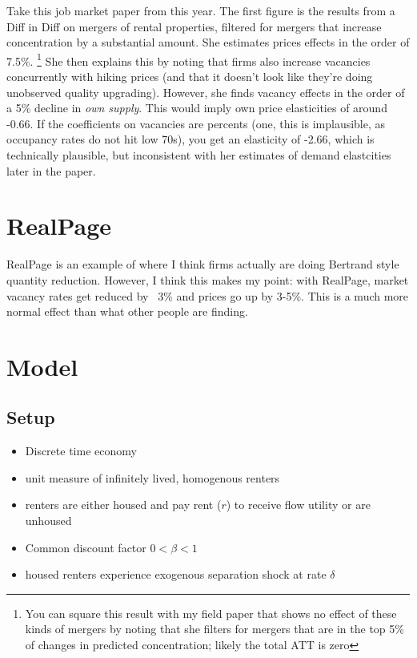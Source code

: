 \documentclass{article}
\begin{document}
Take this job market paper from this year. The first figure is the results from a Diff in Diff on mergers of rental properties, filtered for mergers that increase concentration by a substantial amount. She estimates prices effects in the order of 7.5\%. \footnote{You can square this result with my field paper that shows no effect of these kinds of mergers by noting that she filters for mergers that are in the top 5\% of changes in predicted concentration; likely the total ATT is zero} She then explains this by noting that firms also increase vacancies concurrently with hiking prices (and that it doesn't look like they're doing unobserved quality upgrading). However, she finds vacancy effects in the order of a 5\% decline in \textit{own supply}. This would imply own price elasticities of around -0.66. If the coefficients on vacancies are percents (one, this is implausible, as occupancy rates do not hit low 70s), you get an elasticity of -2.66, which is technically plausible, but inconsistent with her estimates of demand elastcities later in the paper. 


\section{RealPage}
RealPage is an example of where I think firms actually are doing Bertrand style quantity reduction. However, I think this makes my point: with RealPage, market vacancy rates get reduced by ~3\% and prices go up by 3-5\%. This is a much more normal effect than what other people are finding.


\section{Model}

\subsection{Setup}

\begin{itemize}
    \item Discrete time economy
    \item unit measure of infinitely lived, homogenous renters
    \item renters are either housed and pay rent ($r$) to receive flow utility or are unhoused
    \item Common discount factor $0 < \beta < 1$
    \item housed renters experience exogenous separation shock at rate $\delta$
\end{itemize}
\end{document}
